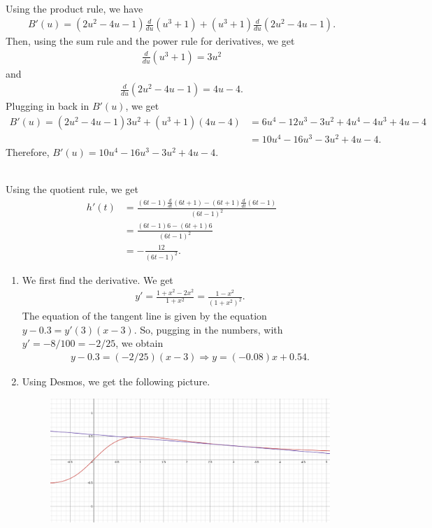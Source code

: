 	\newpage
	
	\\
	Using the product rule, we have
		\begin{align*}
		B'(u) = (2u^2 - 4u - 1) \frac{d}{du} (u^3 + 1) + (u^3 + 1) \frac{d}{du} (2u^2 - 4u - 1) .
		\end{align*}
	Then, using the sum rule and the power rule for derivatives, we get
		\begin{align*}
		\frac{d}{du} (u^3 + 1) = 3u^2
		\end{align*}
	and
		\begin{align*}
		 \frac{d}{du} (2u^2 - 4u - 1) = 4u - 4 .
		\end{align*}
	Plugging in back in $B'(u)$, we get
		\begin{align*}
		B'(u) = (2u^2 - 4u - 1)3u^2 + (u^3 + 1)(4u - 4) &= 6u^4 - 12u^3 - 3u^2 + 4u^4 - 4u^3 + 4u - 4 \\
		&= 10u^4 - 16u^3 - 3u^2 + 4u - 4 .
		\end{align*}
	Therefore, $B'(u) = 10u^4 - 16u^3 - 3u^2 + 4u - 4 $.
	
	\spc
	
	\\
	Using the quotient rule, we get
		\begin{align*}
		h'(t) &= \frac{(6t - 1)\frac{d}{dt} (6t + 1) - (6t + 1) \frac{d}{dt}(6t - 1)}{(6t - 1)^2} \\
		&= \frac{(6t - 1) 6 - (6t + 1) 6}{(6t - 1)^2} \\
		&= - \frac{12}{(6t - 1)^2} .
		\end{align*}
	
	\spc
	
	\begin{enumerate}[label=\textbf{(\alph*)}]
	\item We first find the derivative. We get
		\begin{align*}
		y' = \frac{1 + x^2 - 2x^2}{1 + x^2} = \frac{1 - x^2}{(1 + x^2)^2} .
		\end{align*}
	The equation of the tangent line is given by the equation $y - 0.3 = y'(3) (x - 3)$. So, pugging in the numbers, with $y' = -8/100 = -2/25$, we obtain
		\begin{align*}
		y - 0.3 = (-2/25)(x - 3) \Rightarrow y = (-0.08)x + 0.54 .
		\end{align*}
	\item Using Desmos, we get the following picture.
		\begin{figure}[h]
		\centering
		\includegraphics[scale=0.32]{problem54b.png}
		\end{figure}
	\end{enumerate}
	
